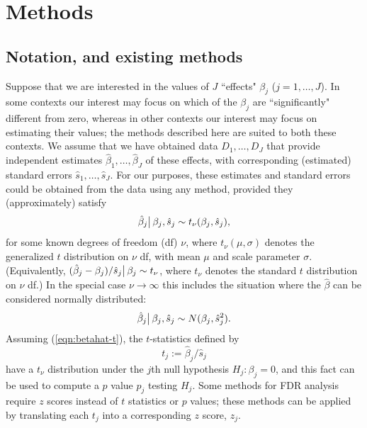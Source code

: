 \documentclass[11pt]{article}
\def\bhat{\hat{\beta}}
\def\shat{\hat{s}}
\begin{document}
\def\df{df}
\def\FDR{\text{FDR}}
\def\fdr{\text{lfdr}}

 \section*{Methods}
 
 \subsection*{Notation, and existing methods}
 
Suppose that we are interested in the values of $J$ ``effects" $\beta_j$ ($j=1,\dots,J$). In some contexts our interest may focus on which of the $\beta_j$ are ``significantly" different from zero, whereas in other contexts our interest may focus on estimating their values; the methods described here are suited to both these contexts.
 We assume that we have obtained data $D_1,\dots,D_J$ that provide independent estimates $\bhat_1,\dots,\bhat_J$ of these effects,
 with corresponding (estimated) standard errors $\shat_1,\dots,\shat_J$. For our purposes, these estimates and standard errors could be obtained from the data
 using any method, provided they (approximately) satisfy 
 \begin{equation} \label{eqn:betahat-t}
 \bhat_j \big{|} \, \beta_j, \shat_j \sim t_\nu(\beta_j,\shat_j),
 \end{equation}
for some known degrees of freedom (\df) $\nu$, where $t_\nu(\mu,\sigma)$ denotes the generalized $t$ distribution on $\nu$ \df, with mean $\mu$ and scale parameter $\sigma$. (Equivalently, $(\bhat_j-\beta_j)/\shat_j \big{|} \, \beta_j \sim t_\nu$, where $t_\nu$ denotes the standard $t$ distribution on $\nu$ \df.)
In the special case $\nu \rightarrow \infty$ this includes the situation where the $\bhat$ can be considered normally distributed:
  \begin{equation} \label{eqn:betahat-norm}
 \bhat_j  \big{|} \, \beta_j, \shat_j \sim N(\beta_j,\shat^2_j).
 \end{equation}
 Assuming (\ref{eqn:betahat-t}), the $t$-statistics defined by
 \begin{equation} 
 t_j:=\bhat_j/\shat_j
 \end{equation}
 have a $t_\nu$ distribution under the $j$th null hypothesis $H_j:\beta_j=0$, and this fact can be used to compute a $p$ value $p_j$ testing $H_j$.
Some methods for FDR analysis require $z$ scores instead of $t$ statistics or $p$ values; these methods can be applied by translating each $t_j$ into a corresponding
$z$ score, $z_j$.
\end{document}
